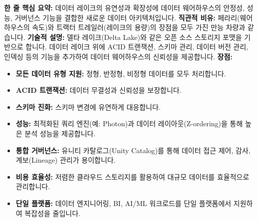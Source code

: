 \documentclass[11pt,a4paper]{article}
\begin{document}
\begin{tcolorbox}[title=\textbf{데이터 레이크하우스 (Data Lakehouse)}, colback=teal!5!white, colframe=teal!75!black, sharp corners, boxrule=0.8pt]
\textbf{한 줄 핵심 요약:} 데이터 레이크의 유연성과 확장성에 데이터 웨어하우스의 안정성, 성능, 거버넌스 기능을 결합한 새로운 데이터 아키텍처입니다.
\textbf{직관적 비유:} 페라리(웨어하우스의 속도)와 트랙터 트레일러(레이크의 용량)의 장점을 모두 가진 만능 차량과 같습니다.
\textbf{기술적 설명:} 델타 레이크(Delta Lake)와 같은 오픈 소스 스토리지 포맷을 기반으로 합니다. 데이터 레이크 위에 ACID 트랜잭션, 스키마 관리, 데이터 버전 관리, 인덱싱 등의 기능을 추가하여 데이터 웨어하우스의 신뢰성을 제공합니다.
\textbf{장점:}
\begin{itemize}
    \item \textbf{모든 데이터 유형 지원:} 정형, 반정형, 비정형 데이터를 모두 처리합니다.
    \item \textbf{ACID 트랜잭션:} 데이터 무결성과 신뢰성을 보장합니다.
    \item \textbf{스키마 진화:} 스키마 변경에 유연하게 대응합니다.
    \item \textbf{성능:} 최적화된 쿼리 엔진(예: Photon)과 데이터 레이아웃(Z-ordering)을 통해 높은 분석 성능을 제공합니다.
    \item \textbf{통합 거버넌스:} 유니티 카탈로그(Unity Catalog)를 통해 데이터 접근 제어, 감사, 계보(Lineage) 관리가 용이합니다.
    \item \textbf{비용 효율성:} 저렴한 클라우드 스토리지를 활용하여 대규모 데이터를 효율적으로 관리합니다.
    \item \textbf{단일 플랫폼:} 데이터 엔지니어링, BI, AI/ML 워크로드를 단일 플랫폼에서 지원하여 복잡성을 줄입니다.
\end{itemize}
\end{tcolorbox}
\end{document}
